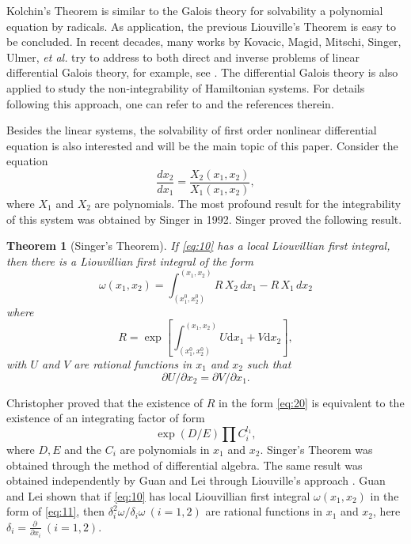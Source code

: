 \documentclass[preprint, 12pt]{elsarticle}
\newtheorem{thm}{Theorem}[section]
\numberwithin{equation}{section}
\renewcommand{\d}{\mathrm{d}}
\begin{document}
Kolchin's Theorem is similar to the Galois theory for solvability a polynomial equation by radicals. As application, the previous Liouville's Theorem is easy to be concluded\cite[Theorem 6.4]{Ka:76}. In recent decades, many works by Kovacic, Magid, Mitschi, Singer, Ulmer, \textit{et al.} try to address to both direct and inverse problems
of linear differential Galois theory, for example, see
\cite{Kova:86,Ma:94, Mi:96-1,Mi:96-2,S:93, S:99, S:01, S:03}. The differential Galois theory is also applied to study the non-integrability of Hamiltonian systems\cite{Ruiz:99}. For
details following this approach, one can refer to
\cite{An:94,Ka:76,K:73, Ruiz:99, S:99, S:03} and the references therein.

Besides the linear systems, the solvability of first order
nonlinear differential equation is also interested and will be the main topic of
this paper. Consider the equation
\begin{equation}
\label{eq:10} \dfrac{d x_2}{d x_1} = \dfrac{X_2(x_1,x_2)}{X_1(x_1,x_2)},
\end{equation}
where $X_1$ and $X_2$ are polynomials. The most profound result for
the integrability of this system was obtained by
Singer\cite{S:92} in 1992. Singer proved the following result.

\begin{thm}[Singer's Theorem]\cite{S:92}
If \eqref{eq:10} has a local Liouvillian first integral, then there
is a Liouvillian first integral of the form 
\begin{equation}
\label{eq:11} 
\omega(x_1,x_2) = \int_{(x_1^0,x_2^0)}^{(x_1,x_2)}
R\,X_2\,d x_1 - R\,X_1\,d x_2 
\end{equation}
 where
\begin{equation}
\label{eq:20} R = \exp\left[\int_{(x_1^0,x_2^0)}^{(x_1,x_2)} U \d
x_1 + V \d x_2\right], 
\end{equation} 
with $U$ and $V$ are
rational functions in $x_1$ and $x_2$ such that
$$\partial
U/\partial x_2 =
\partial V/\partial x_1.$$
\end{thm}

Christopher proved that the existence of $R$ in the form \eqref{eq:20} is
equivalent to the existence of an integrating factor of form
$$\exp(D/E)\prod C_i^{l_1},$$
where $D, E$ and the $C_i$ are polynomials in $x_1$ and $x_2$\cite{Ch:99}.
Singer's Theorem was obtained through the method of differential algebra.
The same result was obtained independently by Guan and Lei through Liouville's
approach \cite{Guan:02}. Guan and Lei shown that if
\eqref{eq:10} has local Liouvillian first integral
$\omega(x_1,x_2)$ in the form of \eqref{eq:11}, then
$\delta_i^2\omega/\delta_i\omega\ (i=1,2)$ are rational functions in $x_1$
and $x_2$, here $\delta_i = \frac{\partial\ }{\partial x_i}\ (i =
1,2)$.
\end{document}
